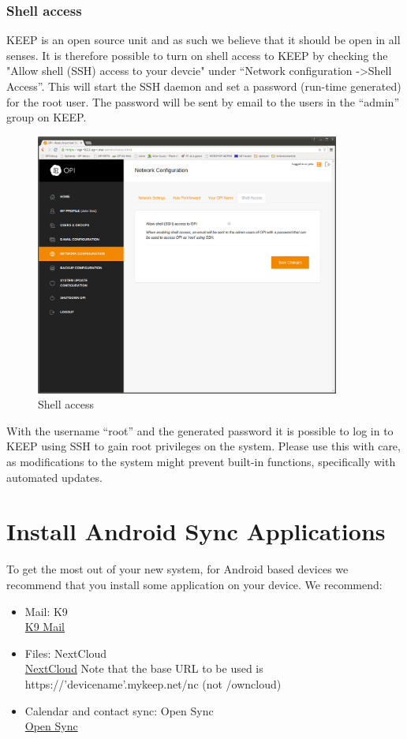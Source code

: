 \documentclass[12pt,a4paper,titlepage]{article}
\begin{document}
\subsubsection{Shell access}
KEEP is an open source unit and as such we believe that it should be open in all senses. It is therefore possible to turn on shell access to KEEP by checking the "Allow shell (SSH) access to your devcie" under ``Network configuration -\textgreater Shell Access''. This will start the SSH daemon and set a password (run-time generated) for the root user. The password will be sent by email to the users in the ``admin'' group on KEEP.
\begin{figure}[h!]
\centering
\includegraphics[width=10cm]{./img/network-shell}
\caption{Shell access}
\end{figure}
\FloatBarrier
With the username ``root'' and the generated password it is possible to log in to KEEP using SSH to gain root privileges on the system. Please use this with care, as modifications to the system might prevent built-in functions, specifically with automated updates.

\newpage
\section{Install Android Sync Applications}
To get the most out of your new system, for Android based devices we recommend that you install some application on your device.
We recommend:
\begin{itemize}
\item Mail: K9\\ \href{https://play.google.com/store/apps/details?id=com.fsck.k9}{K9 Mail}
\item Files: NextCloud\\ \href{https://play.google.com/store/apps/details?id=com.nextcloud.client}{NextCloud}
Note that the base URL to be used is https://'devicename'.mykeep.net/nc (not /owncloud)
\item Calendar and contact sync: Open Sync \\ \href{https://play.google.com/store/apps/details?id=com.deependhulla.opensync}{Open Sync}
\end{itemize}
\end{document}

